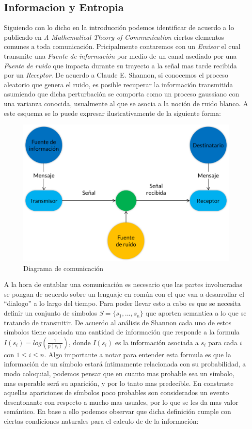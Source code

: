 
\subsection{Informacion y Entropia}

Siguiendo con lo dicho en la introducción podemos identificar de acuerdo a lo
publicado en \textit{A Mathematical Theory of Communication} ciertos elementos
comunes a toda comunicación. Pricipalmente contaremos con un \textit{Emisor} el
cual transmite una \textit{Fuente de información} por medio de un canal
asediado por una \textit{Fuente de ruido} que impacta durante su trayecto a la
señal mas tarde recibida por un \textit{Receptor}. De acuerdo a Claude E.
Shannon, si conocemos el proceso aleatorio que genera el ruido, es posible
recuperar la información transmitida asumiendo que dicha perturbación se
comporta como un proceso gaussiano con una varianza conocida, usualmente al que
se asocia a la noción de ruido blanco. A este esquema se lo puede expresar
ilustrativamente de la siguiente forma:

\begin{figure}[ht]
\begin{center}
\includegraphics[width=0.6\columnwidth]{EsquemaShannon.png}
\caption{Diagrama de comunicación}
\end{center}
\end{figure}


A la hora de entablar una comunicación es necesario que las partes involucradas
se pongan de acuerdo sobre un lenguaje en común con el que van a desarrollar el
"`dialogo"' a lo largo del tiempo. Para poder llevar esto a cabo es que se
necesita definir un conjunto de símbolos $S = \{ s_1, ..., s_n \}$ que aporten
semantica a lo que se tratando de transmitir. De acuerdo al análisis de Shannon
cada uno de estos símbolos tiene asociada una cantidad de información que
responde a la formula $I(s_i) = log(\frac{1}{p(s_i)})$, donde $I(s_i)$ es la
información asociada a $s_i$ para cada $i$ con $1 \leq i \leq n$. Algo
importante a notar para entender esta formula es que la información de un
símbolo estará íntimamente relacionada con su probabilidad, a modo
coloquial, podemos pensar que en cuanto mas probable sea un símbolo, mas
esperable será su aparición, y por lo tanto mas predecible. En constraste
aquellas apariciones de símbolos poco probables son considerados un evento
desentonante con respecto a mucho mas usuales, por lo que se les da mas valor
semántico. En base a ello podemos observar que dicha definición cumple con
ciertas condiciones naturales para el calculo de de la información:

